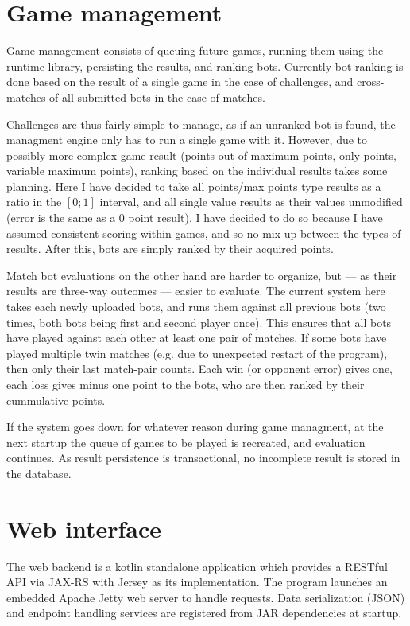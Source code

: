 	\section{Game management}

	Game management consists of queuing future games, running them using the runtime library, persisting the results, and ranking bots. Currently bot ranking is done based on the result of a single game in the case of challenges, and cross-matches of all submitted bots in the case of matches.
	
	Challenges are thus fairly simple to manage, as if an unranked bot is found, the managment engine only has to run a single game with it. However, due to possibly more complex game result (points out of maximum points, only points, variable maximum points), ranking based on the individual results takes some planning. Here I have decided to take all points/max points type results as a ratio in the $[0;1]$ interval, and all single value results as their values unmodified (error is the same as a  0 point result). I have decided to do so because I have assumed consistent scoring within games, and so no mix-up between the types of results. After this, bots are simply ranked by their acquired points.
	
	Match bot evaluations on the other hand are harder to organize, but --- as their results are three-way outcomes --- easier to evaluate. The current system here takes each newly uploaded bots, and runs them against all previous bots (two times, both bots being first and second player once). This ensures that all bots have played against each other at least one pair of matches. If some bots have played multiple twin matches (e.g. due to unexpected restart of the program), then only their last match-pair counts. Each win (or opponent error) gives one, each loss gives minus one point to the bots, who are then ranked by their cummulative points.
	
	If the system goes down for whatever reason during game managment, at the next startup the queue of games to be played is recreated, and evaluation continues. As result persistence is transactional, no incomplete result is stored in the database.

	\section{Web interface}
	
	The web backend is a kotlin standalone application which provides a RESTful API via JAX-RS with Jersey as its implementation. The program launches an embedded Apache Jetty web server to handle requests. Data serialization (JSON) and endpoint handling services are registered from JAR dependencies at startup.

